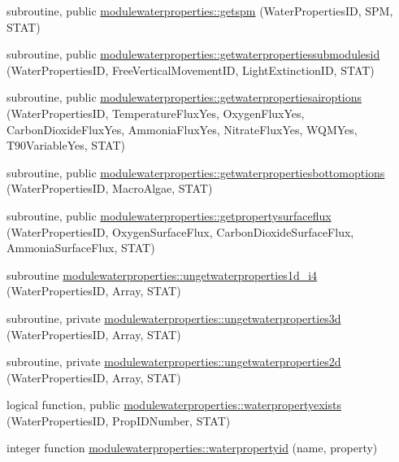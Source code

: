 \begin{DoxyCompactItemize}
\item 
subroutine, public \mbox{\hyperlink{namespacemodulewaterproperties_ae9ef33b9d5369265c98090b0520a41ae}{modulewaterproperties\+::getspm}} (Water\+Properties\+ID, S\+PM, S\+T\+AT)
\item 
subroutine, public \mbox{\hyperlink{namespacemodulewaterproperties_aa92bc10cfb8ceb9e3edd659ae8e6ed71}{modulewaterproperties\+::getwaterpropertiessubmodulesid}} (Water\+Properties\+ID, Free\+Vertical\+Movement\+ID, Light\+Extinction\+ID, S\+T\+AT)
\item 
subroutine, public \mbox{\hyperlink{namespacemodulewaterproperties_a01766661cdbaa08fdb84926b54369de4}{modulewaterproperties\+::getwaterpropertiesairoptions}} (Water\+Properties\+ID, Temperature\+Flux\+Yes, Oxygen\+Flux\+Yes, Carbon\+Dioxide\+Flux\+Yes, Ammonia\+Flux\+Yes, Nitrate\+Flux\+Yes, W\+Q\+M\+Yes, T90\+Variable\+Yes, S\+T\+AT)
\item 
subroutine, public \mbox{\hyperlink{namespacemodulewaterproperties_a7c3194f050d1f1d1afd1dc2fd3e02dec}{modulewaterproperties\+::getwaterpropertiesbottomoptions}} (Water\+Properties\+ID, Macro\+Algae, S\+T\+AT)
\item 
subroutine, public \mbox{\hyperlink{namespacemodulewaterproperties_af2c46d3b317e3d23dca87bea01a118fa}{modulewaterproperties\+::getpropertysurfaceflux}} (Water\+Properties\+ID, Oxygen\+Surface\+Flux, Carbon\+Dioxide\+Surface\+Flux, Ammonia\+Surface\+Flux, S\+T\+AT)
\item 
subroutine \mbox{\hyperlink{namespacemodulewaterproperties_a595720f235e82fd22fab49105706b84e}{modulewaterproperties\+::ungetwaterproperties1d\+\_\+i4}} (Water\+Properties\+ID, Array, S\+T\+AT)
\item 
subroutine, private \mbox{\hyperlink{namespacemodulewaterproperties_ab4f28352125d7c0b068c093e4ffb88dd}{modulewaterproperties\+::ungetwaterproperties3d}} (Water\+Properties\+ID, Array, S\+T\+AT)
\item 
subroutine, private \mbox{\hyperlink{namespacemodulewaterproperties_ab8a50929e1e5fe0ebe591654fa4fd52f}{modulewaterproperties\+::ungetwaterproperties2d}} (Water\+Properties\+ID, Array, S\+T\+AT)
\item 
logical function, public \mbox{\hyperlink{namespacemodulewaterproperties_a2c7278a1e0767b9b9c5419a5b34299f5}{modulewaterproperties\+::waterpropertyexists}} (Water\+Properties\+ID, Prop\+I\+D\+Number, S\+T\+AT)
\item 
integer function \mbox{\hyperlink{namespacemodulewaterproperties_a628b8ae42fe46f1e958582529ab79db4}{modulewaterproperties\+::waterpropertyid}} (name, property)

\end{DoxyCompactItemize}
